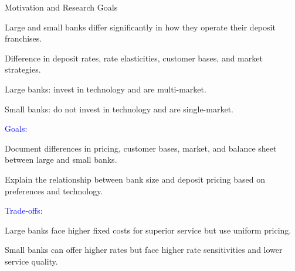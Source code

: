 \documentclass[notes,10pt, aspectratio=169]{beamer}
\newenvironment{wideitemize}{\itemize\addtolength{\itemsep}{10pt}}{\enditemize}
\begin{document}
\begin{frame}{Motivation and Research Goals}
    \begin{wideitemize}
        \item Large and small banks differ significantly in how they operate their deposit franchises.
        \item Difference in deposit rates, rate elasticities, customer bases, and market strategies.
        \item Large banks: invest in technology and are multi-market.
        \item Small banks: do not invest in technology and are single-market.
        \pause

        \item \textcolor{blue}{Goals:}
        \vspace{0.2cm}
        \begin{wideitemize}
            \item Document differences in pricing, customer bases, market, and balance sheet between large and small banks.
            \item Explain the relationship between bank size and deposit pricing based on preferences and technology.
        \end{wideitemize}
        \pause
        \item \textcolor{blue}{Trade-offs:}
        \vspace{0.2cm}
        \begin{wideitemize}
            \item Large banks face higher fixed costs for superior service but use uniform pricing.
            \item Small banks can offer higher rates but face higher rate sensitivities and lower service quality.
        \end{wideitemize}
    \end{wideitemize}
\end{frame}
    
\end{document}
